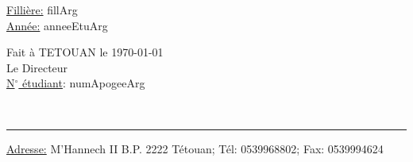 \documentclass[a4paper, 20pt]{article}
\begin{document}
{\hspace{3em}
\underline{Filli\`ere:} fillArg
\vspace{0.3em}\\

\hspace{3em}
\underline{Ann\'ee:} anneeEtuArg 
\vfill

\hfill Fait \`a TETOUAN le \today \hspace{20px}
\vspace{0.7em}\\

\hfill Le Directeur \hspace{55px}
\vspace{1.6em}\\

\hfill\underline{N$^\circ$ \'etudiant}: numApogeeArg \hspace{20px}
}
\vspace{1em} \\ 
\hrule

\begin{center}

    \underline{Adresse:} M'Hannech II B.P. 2222 T\'etouan; T\'el: 0539968802; Fax: 0539994624
\end{center}
\end{document}

